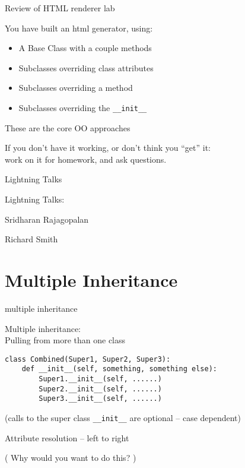 \documentclass{beamer}
\begin{document}
\begin{frame}[fragile]{Review of HTML renderer lab}

{\Large You have built an html generator, using:} 
  \begin{itemize}
    \item A Base Class with a couple methods
    \item Subclasses overriding class attributes
    \item Subclasses overriding a method
    \item Subclasses overriding the \verb|__init__|
  \end{itemize}

\vfill
{\Large These are the core OO approaches}

\vfill
{\Large If you don't have it working, or don't think you ``get'' it:\\
 work on it for homework, and ask questions.}

\end{frame}


\begin{frame}{Lightning Talks}

{\LARGE Lightning Talks:}

\vfill
{\large Sridharan Rajagopalan}

\vfill
{\large Richard Smith}

\end{frame}

\section{Multiple Inheritance}

\begin{frame}[fragile]{multiple inheritance}

{\Large Multiple inheritance:\\
\hspace{0.2in} Pulling from more than one class}

\vfill
\begin{verbatim}
class Combined(Super1, Super2, Super3):
    def __init__(self, something, something else):
        Super1.__init__(self, ......)        
        Super2.__init__(self, ......)        
        Super3.__init__(self, ......)        
\end{verbatim}
(calls to the super class \verb|__init__| are optional -- case dependent)

\vfill
{\Large Attribute resolution -- left to right}

\vfill
( Why would you want to do this? )

\end{frame} 
\end{document}
